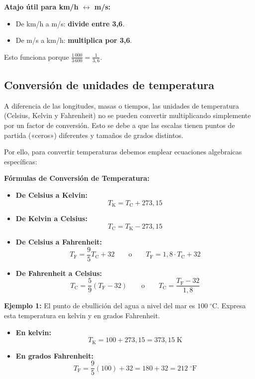 \documentclass[12pt, a4paper]{article}
\begin{document}
\begin{cuadroadvertencia}
\textbf{Atajo útil para km/h $\leftrightarrow$ m/s:}
\begin{itemize}
  \item De km/h a m/s: \textbf{divide entre 3,6}.
  \item De m/s a km/h: \textbf{multiplica por 3,6}.
\end{itemize}
Esto funciona porque $\frac{1\,000}{3\,600} = \frac{1}{3{,}6}$.
\end{cuadroadvertencia}

\newpage

\subsection{Conversión de unidades de temperatura}

A diferencia de las longitudes, masas o tiempos, las unidades de temperatura (Celsius, Kelvin y Fahrenheit) no se pueden convertir multiplicando simplemente por un factor de conversión. Esto se debe a que las escalas tienen puntos de partida («ceros») diferentes y tamaños de grados distintos. 

Por ello, para convertir temperaturas debemos emplear ecuaciones algebraicas específicas:

\begin{cuadroteoria}
\textbf{Fórmulas de Conversión de Temperatura:}
\begin{itemize}[leftmargin=*]
  \item \textbf{De Celsius a Kelvin:} 
  $$T_{\text{K}} = T_{\text{C}} + 273{,}15$$
  \item \textbf{De Kelvin a Celsius:} 
  $$T_{\text{C}} = T_{\text{K}} - 273{,}15$$
  \item \textbf{De Celsius a Fahrenheit:} 
  $$T_{\text{F}} = \frac{9}{5}T_{\text{C}} + 32 \qquad \text{o} \qquad T_{\text{F}} = 1{,}8 \cdot T_{\text{C}} + 32$$
  \item \textbf{De Fahrenheit a Celsius:} 
  $$T_{\text{C}} = \frac{5}{9}(T_{\text{F}} - 32) \qquad \text{o} \qquad T_{\text{C}} = \frac{T_{\text{F}} - 32}{1{,}8}$$
\end{itemize}
\end{cuadroteoria}

\noindent\textbf{Ejemplo 1:} El punto de ebullición del agua a nivel del mar es $100\;^\circ\text{C}$. Expresa esta temperatura en kelvin y en grados Fahrenheit.
\begin{itemize}[leftmargin=*]
  \item \textbf{En kelvin:}
  $$T_{\text{K}} = 100 + 273{,}15 = 373{,}15\;\text{K}$$
  \item \textbf{En grados Fahrenheit:}
  $$T_{\text{F}} = \frac{9}{5}(100) + 32 = 180 + 32 = 212\;^\circ\text{F}$$
\end{itemize}
\end{document}
